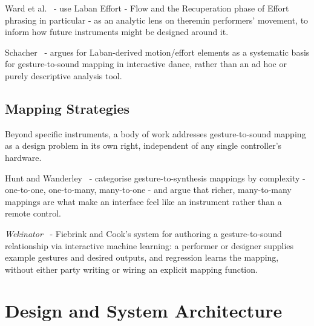 \documentclass[sigconf,nonacm]{acmart}
\begin{document}
Ward et al.~\cite{ward2008thereminists} - use Laban Effort - Flow and the Recuperation phase of
Effort phrasing in particular - as an analytic lens on theremin performers' movement, to inform how
future instruments might be designed around it.

Schacher~\cite{schacher2010motiontogesture} - argues for Laban-derived motion/effort elements as a
systematic basis for gesture-to-sound mapping in interactive dance, rather than an ad hoc or
purely descriptive analysis tool.

\subsection{Mapping Strategies}
Beyond specific instruments, a body of work addresses gesture-to-sound mapping as a design problem
in its own right, independent of any single controller's hardware.

Hunt and Wanderley~\cite{hunt2002mapping} - categorise gesture-to-synthesis mappings by complexity -
one-to-one, one-to-many, many-to-one - and argue that richer, many-to-many mappings are what make an
interface feel like an instrument rather than a remote control.

\textit{Wekinator}~\cite{fiebrink2010wekinator} - Fiebrink and Cook's system for authoring a
gesture-to-sound relationship via interactive machine learning: a performer or designer supplies
example gestures and desired outputs, and regression learns the mapping, without either party
writing or wiring an explicit mapping function.

\section{Design and System Architecture}
\end{document}
